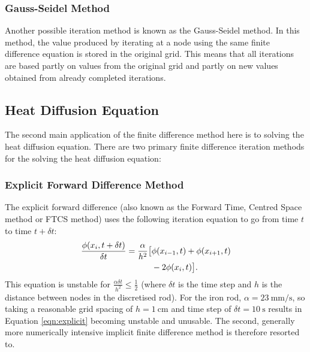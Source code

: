 \subsubsection{Gauss-Seidel Method}

Another possible iteration method is known as the Gauss-Seidel method. In this method, the value produced by iterating at a node using the same finite difference equation is stored in the original grid. This means that all iterations are based partly on values from the original grid and partly on new values obtained from already completed iterations.

\subsection{Heat Diffusion Equation}

The second main application of the finite difference method here is to solving the heat diffusion equation. There are two primary finite difference iteration methods for the solving the heat diffusion equation:

\subsubsection{Explicit Forward Difference Method}
The explicit forward difference (also known as the Forward Time, Centred Space method or FTCS method) uses the following iteration equation to go from time $t$ to time $t+\delta t$:
\begin{align}
    \frac{\phi(x_i,t+\delta t)}{\delta t} = \frac{\alpha}{h^2}\big[&\phi(x_{i-1},t) + \phi(x_{i+1},t) \notag \\
                                                               & - 2\phi(x_i,t)\big].\label{eqn:explicit}
\end{align}
This equation is unstable for $\frac{\alpha \delta t}{h^2} \leq \frac{1}{2}$ (where $\delta t$ is the time step and $h$ is the distance between nodes in the discretised rod). For the iron rod, $\alpha = \SI{23}{\milli\meter\per\second}$, so taking a reasonable grid spacing of $h = \SI{1}{\centi\metre}$ and time step of $\delta t = \SI{10}{\second}$ results in Equation \ref{eqn:explicit} becoming unstable and unusable. The second, generally more numerically intensive implicit finite difference method is therefore resorted to.

